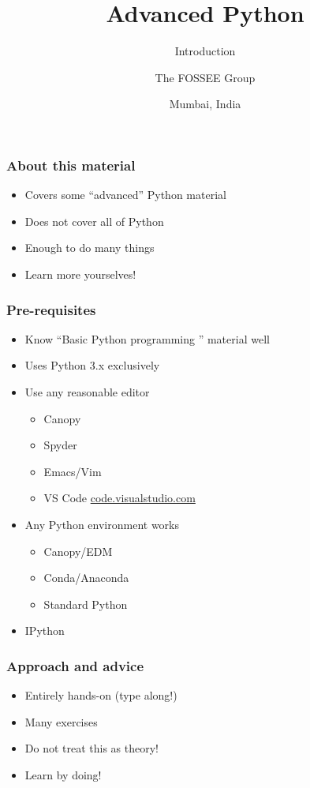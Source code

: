 \documentclass[14pt,compress,aspectratio=169]{beamer}
\title[Introduction]{Advanced Python}
\subtitle{Introduction}
\author[FOSSEE] {The FOSSEE Group}
\institute[IIT Bombay] {Department of Aerospace Engineering\\IIT Bombay}
\date[] {Mumbai, India}
\begin{document}
\begin{frame}
  \titlepage
\end{frame}

\begin{frame}
  \frametitle{About this material}
  \begin{itemize}
  \item Covers some ``advanced'' Python material
  \item Does not cover all of Python
  \item Enough to do many things
    \vspace*{0.5in}
  \item Learn more yourselves!
  \end{itemize}
\end{frame}

\begin{frame}
  \frametitle{Pre-requisites}
  \begin{itemize}
  \item Know ``Basic Python programming '' material well
  \item Uses Python 3.x exclusively
  \item Use any reasonable editor
    \begin{itemize}
    \item Canopy
    \item Spyder
    \item Emacs/Vim
    \item VS Code \url{code.visualstudio.com}
    \end{itemize}
  \item Any Python environment works
    \begin{itemize}
    \item Canopy/EDM
    \item Conda/Anaconda
    \item Standard Python
    \end{itemize}
  \item IPython
  \end{itemize}
\end{frame}

\begin{frame}
  \frametitle{Approach and advice}
  \begin{itemize}
  \item Entirely hands-on (type along!)
  \item Many exercises
  \item Do not treat this as theory!
  \item \alert{Learn by doing!}
  \end{itemize}
\end{frame}
\end{document}

